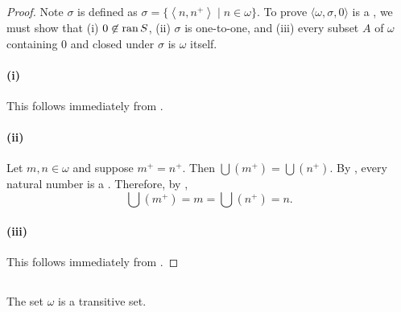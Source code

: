 \documentclass{report}
\newcommand{\pair}[1]{\left< #1 \right>}
\begin{document}
\begin{proof}


  Note $\sigma$ is defined as $\sigma = \{\pair{n, n^+} \mid n \in \omega\}$.
  To prove $\langle \omega, \sigma, 0 \rangle$ is a ,
    we must show that (i) $0 \not\in \mathop{\text{ran}}{S}$, (ii) $\sigma$ is one-to-one, and
    (iii) every subset $A$ of $\omega$ containing $0$ and closed under $\sigma$
    is $\omega$ itself.

  \paragraph{(i)}%

    This follows immediately from .

  \paragraph{(ii)}%

    Let $m, n \in \omega$ and suppose $m^+ = n^+$.
    Then $\bigcup \left(m^+\right) = \bigcup \left(n^+\right)$.
    By , every natural number is a
      .
    Therefore, by ,
      $$\bigcup \left(m^+\right) = m = \bigcup \left(n^+\right) = n.$$

  \paragraph{(iii)}%

    This follows immediately from .

\end{proof}

\subsection{}%

\begin{theorem}[4G]

  The set $\omega$ is a transitive set.

\end{theorem}
\end{document}
